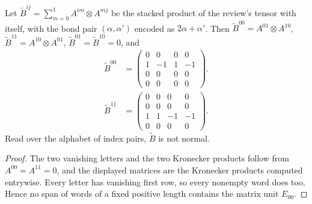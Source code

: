 \begin{lemma}
    \label{thm:asymex_czx_review_square_tensor}
    \leanok
    Let $\widetilde B^{ij}=\sum_{m=0}^1A^{im}\otimes A^{mj}$ be the stacked product of
    the review's tensor with itself, with the bond pair $(\alpha,\alpha')$
    encoded as $2\alpha+\alpha'$. Then $\widetilde B^{00}=A^{01}\otimes A^{10}$,
    $\widetilde B^{11}=A^{10}\otimes A^{01}$, $\widetilde B^{01}=\widetilde B^{10}=0$, and
    \begin{align}
        \widetilde B^{00} & =\begin{pmatrix}
                                 0 & 0  & 0 & 0  \\
                                 1 & -1 & 1 & -1 \\
                                 0 & 0  & 0 & 0  \\
                                 0 & 0  & 0 & 0
                             \end{pmatrix}.
        \label{eq:asymex_czx_review_bzero}
    \end{align}
    \begin{align}
        \widetilde B^{11} & =\begin{pmatrix}
                                 0 & 0 & 0  & 0  \\
                                 0 & 0 & 0  & 0  \\
                                 1 & 1 & -1 & -1 \\
                                 0 & 0 & 0  & 0
                             \end{pmatrix}.
        \label{eq:asymex_czx_review_bone}
    \end{align}
    Read over the alphabet of index pairs, $\widetilde B$ is not normal.
\end{lemma}

\begin{proof}
    \leanok
    The two vanishing letters and the two Kronecker products follow from
    $A^{00}=A^{11}=0$, and the displayed matrices are the Kronecker
    products computed entrywise. Every letter has vanishing first row, so
    every nonempty word does too. Hence no span of words of a fixed
    positive length contains the matrix unit $E_{00}$.
\end{proof}

